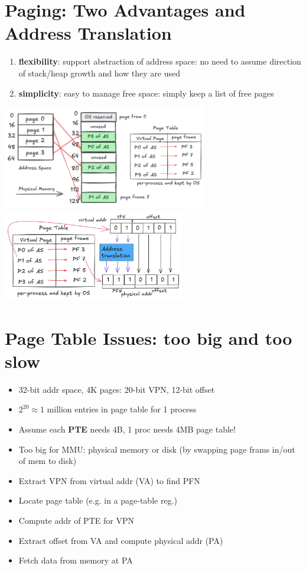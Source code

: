 \section*{Paging: Two Advantages and Address Translation}
\begin{enumerate}
\item \textbf{flexibility}: support abstraction of address space: no need to assume direction of stack/heap growth and how they are used
\item \textbf{simplicity}: easy to manage free space: simply keep a list of free pages
\end{enumerate}
\includegraphics[width=\linewidth,height=4.5cm]{imgs/page_table}
\includegraphics[width=\linewidth,height=4cm]{imgs/address_trans}
\section*{Page Table Issues: too big and too slow}
\begin{minipage}{0.5\linewidth}
  \flushleft
  \begin{itemize}
  \item 32-bit addr space, 4K pages: 20-bit VPN, 12-bit offset
  \item $2^{20} \approx 1$ million entries in page table for 1 process
  \item Assume each \textbf{PTE} needs 4B, 1 proc needs 4MB page table!
  \item Too big for MMU: physical memory or disk (by swapping page frams in/out of mem to disk)
  \end{itemize}
\end{minipage}
\begin{minipage}{0.5\linewidth}
  \begin{itemize}
  \item Extract VPN from virtual addr (VA) to find PFN
  \item Locate page table (e.g. in a page-table reg.)
  \item Compute addr of PTE for VPN
  \item Extract offset from VA and compute physical addr (PA)
  \item Fetch data from memory at PA
  \end{itemize}
\end{minipage}
